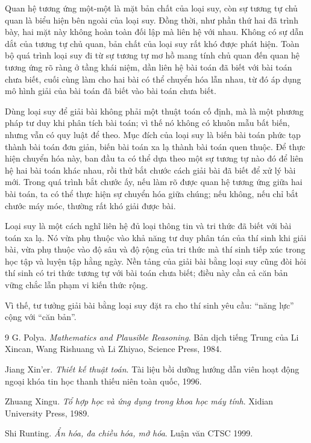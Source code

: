 \documentclass[11pt]{article}
\begin{document}
Quan hệ tương ứng một-một là mặt bản chất của loại suy, còn sự tương tự chủ
quan là biểu hiện bên ngoài của loại suy. Đồng thời, như phần thứ hai đã trình
bày, hai mặt này không hoàn toàn đối lập mà liên hệ với nhau. Không có sự dẫn
dắt của tương tự chủ quan, bản chất của loại suy rất khó được phát hiện. Toàn
bộ quá trình loại suy đi từ sự tương tự mơ hồ mang tính chủ quan đến quan hệ
tương ứng rõ ràng ở tầng khái niệm, dần liên hệ bài toán đã biết với bài toán
chưa biết, cuối cùng làm cho hai bài có thể chuyển hóa lẫn nhau, từ đó áp
dụng mô hình giải của bài toán đã biết vào bài toán chưa biết.

Dùng loại suy để giải bài không phải một thuật toán cố định, mà là một phương
pháp tư duy khi phân tích bài toán; vì thế nó không có khuôn mẫu bất biến,
nhưng vẫn có quy luật để theo. Mục đích của loại suy là biến bài toán phức tạp
thành bài toán đơn giản, biến bài toán xa lạ thành bài toán quen thuộc. Để
thực hiện chuyển hóa này, ban đầu ta có thể dựa theo một sự tương tự nào đó để
liên hệ hai bài toán khác nhau, rồi thử bắt chước cách giải bài đã biết để xử
lý bài mới. Trong quá trình bắt chước ấy, nếu làm rõ được quan hệ tương ứng
giữa hai bài toán, ta có thể thực hiện sự chuyển hóa giữa chúng; nếu không,
nếu chỉ bắt chước máy móc, thường rất khó giải được bài.

Loại suy là một cách nghĩ liên hệ đủ loại thông tin và tri thức đã biết với
bài toán xa lạ. Nó vừa phụ thuộc vào khả năng tư duy phân tán của thí sinh khi
giải bài, vừa phụ thuộc vào độ sâu và độ rộng của tri thức mà thí sinh tiếp
xúc trong học tập và luyện tập hằng ngày. Nền tảng của giải bài bằng loại suy
cũng đòi hỏi thí sinh có tri thức tương tự với bài toán chưa biết; điều này
cần cả căn bản vững chắc lẫn phạm vi kiến thức rộng.

Vì thế, tư tưởng giải bài bằng loại suy đặt ra cho thí sinh yêu cầu:
``năng lực'' cộng với ``căn bản''.

\begin{thebibliography}{9}
G. Polya.
\textit{Mathematics and Plausible Reasoning}.
Bản dịch tiếng Trung của Li Xincan, Wang Rishuang và Li Zhiyao,
Science Press, 1984.

Jiang Xin'er.
\textit{Thiết kế thuật toán}.
Tài liệu bồi dưỡng hướng dẫn viên hoạt động ngoại khóa tin học thanh thiếu
niên toàn quốc, 1996.

Zhuang Xingu.
\textit{Tổ hợp học và ứng dụng trong khoa học máy tính}.
Xidian University Press, 1989.

Shi Runting.
\textit{Ẩn hóa, đa chiều hóa, mở hóa}.
Luận văn CTSC 1999.
\end{thebibliography}
\end{document}
